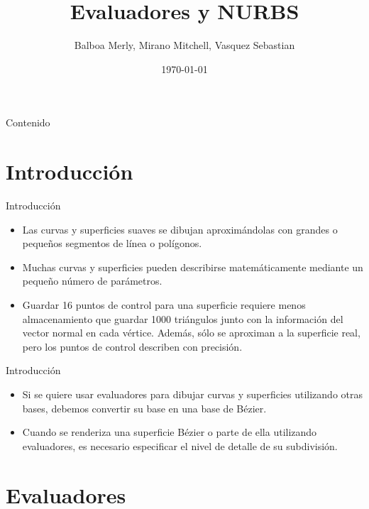 \documentclass[10.5pt]{beamer}
\title{Evaluadores y NURBS}
\author{Balboa Merly, Mirano Mitchell, Vasquez Sebastian}
\institute{UNMSM--Computación Cientfica}
\date{\today}
\begin{document}
\begin{frame}
\maketitle
\end{frame}


\begin{frame}{Contenido}
    \tableofcontents
\end{frame}


\section{Introducción}

\begin{frame}{Introducción}
\begin{itemize}
\justifying
    \item  Las curvas y superficies suaves se dibujan aproximándolas con grandes o pequeños segmentos de línea o polígonos.
    \item   Muchas curvas y superficies pueden describirse matemáticamente mediante un pequeño número de parámetros.
    \item   Guardar 16 puntos de control para una superficie requiere menos almacenamiento que guardar 1000 triángulos junto con la información del vector normal en cada vértice. Además, sólo se aproximan a la superficie real, pero los puntos de control describen con precisión.
\end{itemize}
\end{frame}
\begin{frame}{Introducción}
\begin{itemize}
\justifying
    \item  Si se quiere usar evaluadores para dibujar curvas y superficies utilizando otras bases, debemos convertir su base en una base de Bézier.
    \item   Cuando se renderiza una superficie Bézier o parte de ella utilizando evaluadores, es necesario especificar el nivel de detalle de su subdivisión.
\end{itemize}
\end{frame}
\section{Evaluadores}
\end{document}
